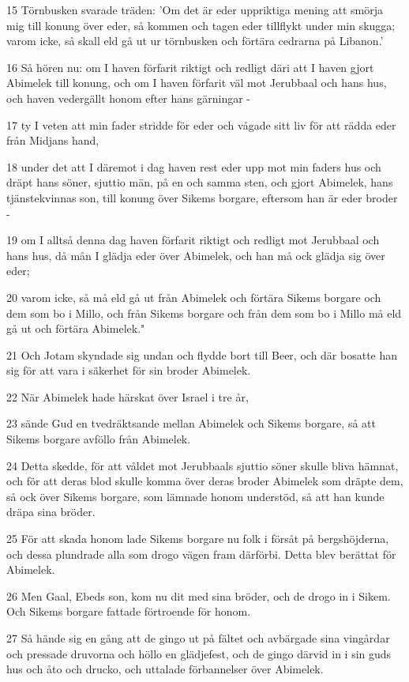 \par 15 Törnbusken svarade träden: 'Om det är eder uppriktiga mening att smörja mig till konung över eder, så kommen och tagen eder tillflykt under min skugga; varom icke, så skall eld gå ut ur törnbusken och förtära cedrarna på Libanon.'
\par 16 Så hören nu: om I haven förfarit riktigt och redligt däri att I haven gjort Abimelek till konung, och om I haven förfarit väl mot Jerubbaal och hans hus, och haven vedergällt honom efter hans gärningar -
\par 17 ty I veten att min fader stridde för eder och vågade sitt liv för att rädda eder från Midjans hand,
\par 18 under det att I däremot i dag haven rest eder upp mot min faders hus och dräpt hans söner, sjuttio män, på en och samma sten, och gjort Abimelek, hans tjänstekvinnas son, till konung över Sikems borgare, eftersom han är eder broder -
\par 19 om I alltså denna dag haven förfarit riktigt och redligt mot Jerubbaal och hans hus, då mån I glädja eder över Abimelek, och han må ock glädja sig över eder;
\par 20 varom icke, så må eld gå ut från Abimelek och förtära Sikems borgare och dem som bo i Millo, och från Sikems borgare och från dem som bo i Millo må eld gå ut och förtära Abimelek."
\par 21 Och Jotam skyndade sig undan och flydde bort till Beer, och där bosatte han sig för att vara i säkerhet för sin broder Abimelek.
\par 22 När Abimelek hade härskat över Israel i tre år,
\par 23 sände Gud en tvedräktsande mellan Abimelek och Sikems borgare, så att Sikems borgare avföllo från Abimelek.
\par 24 Detta skedde, för att våldet mot Jerubbaals sjuttio söner skulle bliva hämnat, och för att deras blod skulle komma över deras broder Abimelek som dräpte dem, så ock över Sikems borgare, som lämnade honom understöd, så att han kunde dräpa sina bröder.
\par 25 För att skada honom lade Sikems borgare nu folk i försåt på bergshöjderna, och dessa plundrade alla som drogo vägen fram därförbi. Detta blev berättat för Abimelek.
\par 26 Men Gaal, Ebeds son, kom nu dit med sina bröder, och de drogo in i Sikem. Och Sikems borgare fattade förtroende för honom.
\par 27 Så hände sig en gång att de gingo ut på fältet och avbärgade sina vingårdar och pressade druvorna och höllo en glädjefest, och de gingo därvid in i sin guds hus och åto och drucko, och uttalade förbannelser över Abimelek.
